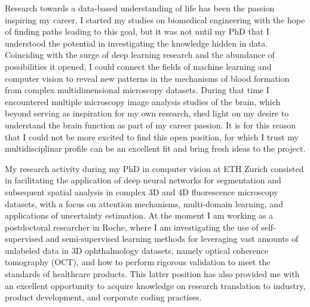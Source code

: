\documentclass[10pt, letter]{ag-cv} %
\begin{document}
\makecvheader %

\makelettertitlenorec %


\begin{cvletter}






\begin{flushleft}
Research towards a data-based understanding of life has been the passion inspiring my career. I started my studies on biomedical engineering with the hope of finding paths leading to this goal, but it was not until my PhD that I understood the potential in investigating the knowledge hidden in data. Coinciding with the surge of deep learning research and the abundance of possibilities it opened, I could connect the fields of machine learning and computer vision to reveal new patterns in the  mechanisms of blood formation from complex multidimensional microscopy datasets. During that time I encountered multiple microscopy image analysis studies of the brain, which beyond serving as inspiration for my own research, shed light on my desire to understand the brain function as part of my career passion. It is for this reason that I could not be more excited to find this open position, for which I trust my multidisciplinar profile can be an excellent fit and bring fresh ideas to the project.  

My research activity during my PhD in computer vision at ETH Zurich consisted in facilitating the application of deep neural networks for segmentation and subsequent spatial analysis in complex 3D and 4D fluorescence microscopy datasets, with a focus on attention mechanisms, multi-domain learning, and applications of uncertainty estimation. At the moment I am working as a postdoctoral researcher in Roche, where I am investigating the use of self-supervised and semi-supervised learning methods for leveraging vast amounts of unlabeled data in 3D ophthalmology datasets, namely optical coherence tomography (OCT), and how to perform rigorous validation to meet the standards of healthcare products. This latter position has also provided me with an excellent opportunity to acquire knowledge on research translation to industry, product development, and corporate coding practises. 


\end{flushleft}
\end{cvletter}
\end{document}
